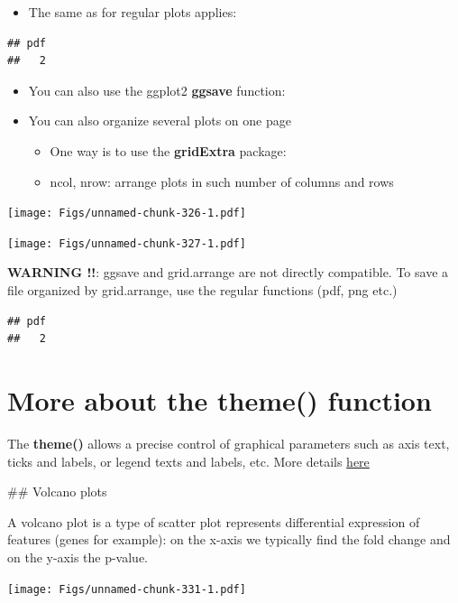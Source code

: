 \documentclass[]{book}
\providecommand{\tightlist}{%
  \setlength{\itemsep}{0pt}\setlength{\parskip}{0pt}}
\begin{document}
\begin{itemize}
\tightlist
\item
  The same as for regular plots applies:
\end{itemize}

\begin{verbatim}
## pdf 
##   2
\end{verbatim}

\begin{itemize}
\item
  You can also use the ggplot2 \textbf{ggsave} function:
\item
  You can also organize several plots on one page

  \begin{itemize}
  \tightlist
  \item
    One way is to use the \textbf{gridExtra} package:
  \item
    ncol, nrow: arrange plots in such number of columns and rows
  \end{itemize}
\end{itemize}

\texttt{[image: Figs/unnamed-chunk-326-1.pdf]}

\texttt{[image: Figs/unnamed-chunk-327-1.pdf]}

\textbf{WARNING !!}: ggsave and grid.arrange are not directly compatible. To save a file organized by grid.arrange, use the regular functions (pdf, png etc.)

\begin{verbatim}
## pdf 
##   2
\end{verbatim}

\hypertarget{more-about-the-theme-function}{%
\section{More about the theme() function}\label{more-about-the-theme-function}}

The \textbf{theme()} allows a precise control of graphical parameters such as axis text, ticks and labels, or legend texts and labels, etc.
More details \href{https://ggplot2.tidyverse.org/reference/theme.html}{here}

\#\# Volcano plots

A volcano plot is a type of scatter plot represents differential expression of features (genes for example): on the x-axis we typically find the fold change and on the y-axis the p-value.

\texttt{[image: Figs/unnamed-chunk-331-1.pdf]}
\end{document}
